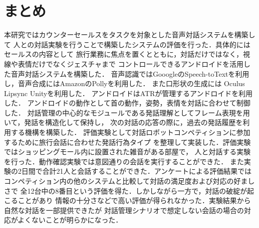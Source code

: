 \section{まとめ}
\label{まとめ}
本研究ではカウンターセールスをタスクを対象とした音声対話システムを構築して
人との対話実験を行うことで構築したシステムの評価を行った．具体的にはセールスの内容として
旅行業務に焦点を置くとともに，対話だけではなく，視線や表情だけでなくジェスチャまで
コントロールできるアンドロイドを活用した音声対話システムを構築した．
音声認識ではGooogleのSpeech-toTextを利用し，音声合成にはAmazonのPollyを利用した．
また口形状の生成には Oculus Lipsync Unityを利用した．
アンドロイドはATRが管理するアンドロイドを利用した．
アンドロイドの動作として首の動作，姿勢，表情を対話に合わせて制御した．
対話管理の中心的なモジュールである発話理解としてフレーム表現を用いて，発話を構造化して保持し，
次の対話の応答の際に，過去の発話履歴を利用する機構を構築した．
評価実験として対話ロボットコンペティションに参加するために旅行会話に合わせた発話行為タイプ
を整理して実装した．評価実験ではショッピングモール内に設置された雑音がある部屋で，
人と対話する実験を行った．動作確認実験では意図通りの会話を実行することができた．
また実験の2日間で合計21人と会話することができた．アンケートによる評価結果では
コンペティション内の他のシステムと比較して対話の満足度および対応の好ましさで
全12台中の8番目という評価を得た．しかしながら一方で，対話の破綻が起こることがあり
情報の十分さなどで高い評価が得られなかった．実験結果から自然な対話を一部提供できたが
対話管理シナリオで想定しない会話の場合の対応がよくないことが明らかになった．


